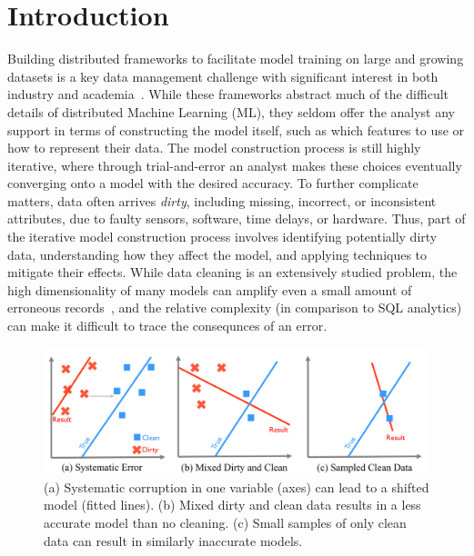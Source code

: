 \section{Introduction}
Building distributed frameworks to facilitate model training on large and growing datasets is a key data management challenge with significant interest in both industry and academia~\cite{bdas, alexandrov2014stratosphere, crotty2014tupleware, tensor}.
While these frameworks abstract much of the difficult details of distributed Machine Learning (ML), they seldom offer the analyst any support in terms of constructing the model itself, such as which features to use or how to represent their data.
The model construction process is still highly iterative, where through trial-and-error an analyst makes these choices eventually converging onto a model with the desired accuracy.
To further complicate matters, data often arrives \emph{dirty}, including missing, incorrect, or inconsistent attributes, due to faulty sensors, software, time delays, or hardware.
Thus, part of the iterative model construction process involves identifying potentially dirty data, understanding how they affect the model, and applying techniques to mitigate their effects.  
While data cleaning is an extensively studied problem, the high dimensionality of many models can amplify even a small amount of erroneous records~\cite{xiaofeature}, and the relative complexity (in comparison to SQL analytics) can make it difficult to trace the consequnces of an error.

\begin{figure}[t]
\centering
 \includegraphics[width=\columnwidth]{figs/update-arch.png}
 \caption{ (a) Systematic corruption in one variable (axes) can lead to a shifted model (fitted lines). 
 (b) Mixed dirty and clean data results in a less accurate model than no cleaning.
(c) Small samples of only clean data can result in similarly inaccurate models. \label{update-arch1}}
\end{figure}

